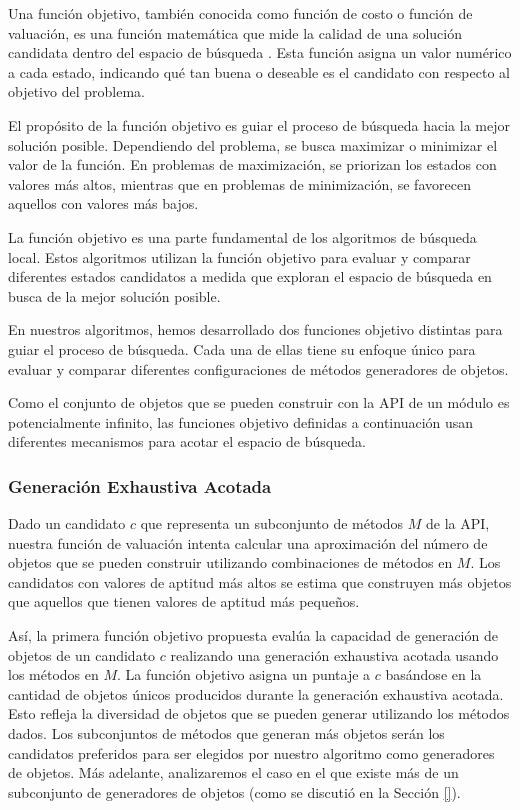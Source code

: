 Una función objetivo, también conocida como función de costo o función de valuación, es una función matemática que mide la calidad de una solución candidata dentro del espacio de búsqueda \cite{}. Esta función asigna un valor numérico a cada estado, indicando qué tan buena o deseable es el candidato con respecto al objetivo del problema.

El propósito de la función objetivo es guiar el proceso de búsqueda hacia la mejor solución posible. Dependiendo del problema, se busca maximizar o minimizar el valor de la función. En problemas de maximización, se priorizan los estados con valores más altos, mientras que en problemas de minimización, se favorecen aquellos con valores más bajos.

La función objetivo es una parte fundamental de los algoritmos de búsqueda local. Estos algoritmos utilizan la función objetivo para evaluar y comparar diferentes estados candidatos a medida que exploran el espacio de búsqueda en busca de la mejor solución posible.

En nuestros algoritmos, hemos desarrollado dos funciones objetivo distintas para guiar el proceso de búsqueda. Cada una de ellas tiene su enfoque único para evaluar y comparar diferentes configuraciones de métodos generadores de objetos.

Como el conjunto de objetos que se pueden construir con la API de un módulo es potencialmente infinito, las funciones objetivo definidas a continuación usan diferentes mecanismos para acotar el espacio de búsqueda.


\subsubsection{Generación Exhaustiva Acotada}
\label{sec:fitnessGE}

Dado un candidato $c$ que representa un subconjunto de métodos $M$ de la API, nuestra función de valuación intenta calcular una aproximación del número de objetos que se pueden construir utilizando combinaciones de métodos en $M$. Los candidatos con valores de aptitud más altos se estima que construyen más objetos que aquellos que tienen valores de aptitud más pequeños.

Así, la primera función objetivo propuesta evalúa la capacidad de generación de objetos de un candidato $c$ realizando una generación exhaustiva acotada \cite{Politano20} usando los métodos en $M$. La función objetivo asigna un puntaje a $c$ basándose en la cantidad de objetos únicos producidos durante la generación exhaustiva acotada. Esto refleja la diversidad de objetos que se pueden generar utilizando los métodos dados. Los subconjuntos de métodos que generan más objetos serán los candidatos preferidos para ser elegidos por nuestro algoritmo como generadores de objetos. Más adelante, analizaremos el caso en el que existe más de un subconjunto de generadores de objetos (como se discutió en la Sección \ref{}).

